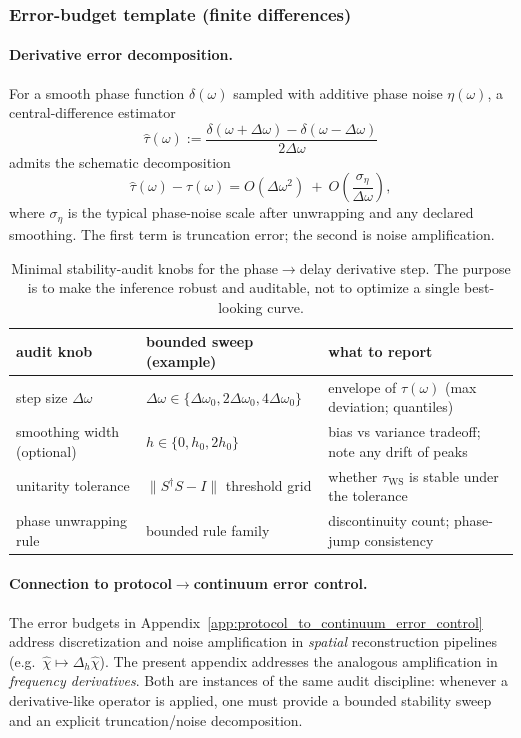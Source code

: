 \subsubsection{Error-budget template (finite differences)}
\paragraph{Derivative error decomposition.}
\AuditTag For a smooth phase function $\delta(\omega)$ sampled with additive phase noise $\eta(\omega)$, a central-difference estimator
\[
\widehat\tau(\omega):=\frac{\delta(\omega+\Delta\omega)-\delta(\omega-\Delta\omega)}{2\Delta\omega}
\]
admits the schematic decomposition
\[
\widehat\tau(\omega)-\tau(\omega)
=
O(\Delta\omega^2)\ +\ O\!\left(\frac{\sigma_\eta}{\Delta\omega}\right),
\]
where $\sigma_\eta$ is the typical phase-noise scale after unwrapping and any declared smoothing.
The first term is truncation error; the second is noise amplification.

\begin{table}[t]
\centering
\small
\setlength{\tabcolsep}{10pt}
\renewcommand{\arraystretch}{1.15}
\begin{tabular}{p{} p{} p{}}
\toprule
audit knob & bounded sweep (example) & what to report \\
\midrule
step size $\Delta\omega$ & $\Delta\omega\in\{\Delta\omega_0,2\Delta\omega_0,4\Delta\omega_0\}$ & envelope of $\tau(\omega)$ (max deviation; quantiles) \\
smoothing width (optional) & $h\in\{0,h_0,2h_0\}$ & bias vs variance tradeoff; note any drift of peaks \\
unitarity tolerance & $\|S^\dagger S-I\|$ threshold grid & whether $\tau_{\mathrm{WS}}$ is stable under the tolerance \\
phase unwrapping rule & bounded rule family & discontinuity count; phase-jump consistency \\
\bottomrule
\end{tabular}
\caption{Minimal stability-audit knobs for the phase$\to$delay derivative step. The purpose is to make the inference robust and auditable, not to optimize a single best-looking curve.}
\label{tab:force_phase_delay_audit_knobs}
\end{table}

\paragraph{Connection to protocol$\to$continuum error control.}
\AuditTag The error budgets in Appendix~\ref{app:protocol_to_continuum_error_control} address discretization and noise amplification in \emph{spatial} reconstruction pipelines (e.g.\ $\widehat\chi\mapsto \Delta_h\widehat\chi$).
The present appendix addresses the analogous amplification in \emph{frequency derivatives}.
Both are instances of the same audit discipline: whenever a derivative-like operator is applied, one must provide a bounded stability sweep and an explicit truncation/noise decomposition.
